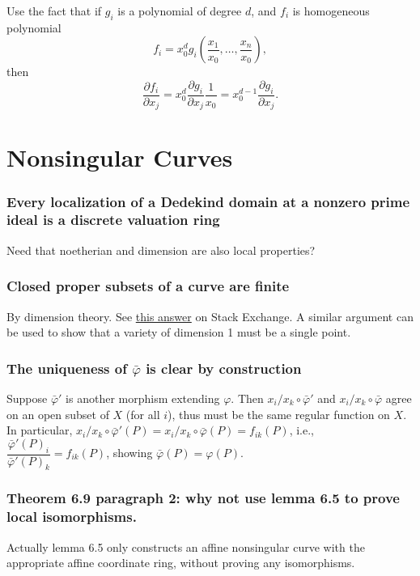 \documentclass{note}
\begin{document}
Use the fact that if $g_i$ is a polynomial of degree $d$, and $f_i$ is
homogeneous polynomial
\begin{equation*}
  f_i = x_0^d g_i\left(\frac{x_1}{x_0}, \dots, \frac{x_n}{x_0}\right),
\end{equation*}
then
\begin{equation*}
  \frac{\partial f_i}{\partial x_j}
  = x_0^d\frac{\partial g_i}{\partial x_j}\frac{1}{x_0}
  = x_0^{d-1}\frac{\partial g_i}{\partial x_j}.
\end{equation*}

\section{Nonsingular Curves}
\subsubsection*{Every localization of a Dedekind domain at a nonzero
  prime ideal is a discrete valuation ring}
Need that noetherian and dimension are also local properties?

\subsubsection*{Closed proper subsets of a curve are finite}
By dimension theory. See
\href{https://math.stackexchange.com/questions/140592/closed-proper-subvarieties-of-curves-are-finite-sets-of-points}
{this answer} on Stack Exchange. A similar argument can be used to
show that a variety of dimension 1 must be a single point.

\subsubsection*{The uniqueness of $\bar\varphi$ is clear by
  construction}
Suppose $\bar\varphi'$ is another morphism extending $\varphi$. Then
$x_i/x_k\circ\bar\varphi'$ and $x_i/x_k\circ\bar\varphi$ agree on an
open subset of $X$ (for all $i$), thus must be the same regular
function on $X$. In particular,
$x_i/x_k\circ\bar\varphi'(P) = x_i/x_k\circ\bar\varphi(P) =
f_{ik}(P)$, i.e.,
$\dfrac{\bar\varphi'(P)_i}{\bar\varphi'(P)_k} = f_{ik}(P)$, showing
$\bar\varphi(P) = \varphi(P)$.

\subsubsection*{Theorem 6.9 paragraph 2: why not use lemma 6.5 to
  prove local isomorphisms.}
Actually lemma 6.5 only constructs an affine nonsingular curve with
the appropriate affine coordinate ring, without proving any
isomorphisms.
\end{document}
